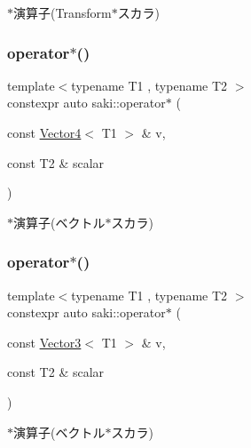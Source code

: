$\ast$演算子(Transform$\ast$スカラ) 

\mbox{\label{namespacesaki_a856b63c2955b0387574c0b5e6d3c0b87}} 
\subsubsection{\texorpdfstring{operator$\ast$()}{operator*()}\hspace{0.1cm}{\footnotesize\ttfamily [2/14]}}
{\footnotesize\ttfamily template$<$typename T1 , typename T2 $>$ \\
constexpr auto saki\+::operator$\ast$ (\begin{DoxyParamCaption}\item[{const \mbox{\hyperlink{classsaki_1_1_vector4}{Vector4}}$<$ T1 $>$ \&}]{v,  }\item[{const T2 \&}]{scalar }\end{DoxyParamCaption})}



$\ast$演算子(ベクトル$\ast$スカラ) 

\mbox{\label{namespacesaki_a7e8da947afb09174d52b0e4aaa185d71}} 
\subsubsection{\texorpdfstring{operator$\ast$()}{operator*()}\hspace{0.1cm}{\footnotesize\ttfamily [3/14]}}
{\footnotesize\ttfamily template$<$typename T1 , typename T2 $>$ \\
constexpr auto saki\+::operator$\ast$ (\begin{DoxyParamCaption}\item[{const \mbox{\hyperlink{classsaki_1_1_vector3}{Vector3}}$<$ T1 $>$ \&}]{v,  }\item[{const T2 \&}]{scalar }\end{DoxyParamCaption})}



$\ast$演算子(ベクトル$\ast$スカラ) 

\mbox{\label{namespacesaki_a9b267db283c1b65ccf046a239443f5dd}} 
